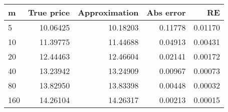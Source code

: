 \begin{tabular}{lrrrr}
\toprule
m &  True price &  Approximation &  Abs error &       RE \\
\midrule
5   &    10.06425 &       10.18203 &    0.11778 &  0.01170 \\
10  &    11.39775 &       11.44688 &    0.04913 &  0.00431 \\
20  &    12.44463 &       12.46604 &    0.02141 &  0.00172 \\
40  &    13.23942 &       13.24909 &    0.00967 &  0.00073 \\
80  &    13.82950 &       13.83398 &    0.00448 &  0.00032 \\
160 &    14.26104 &       14.26317 &    0.00213 &  0.00015 \\
\bottomrule
\end{tabular}
